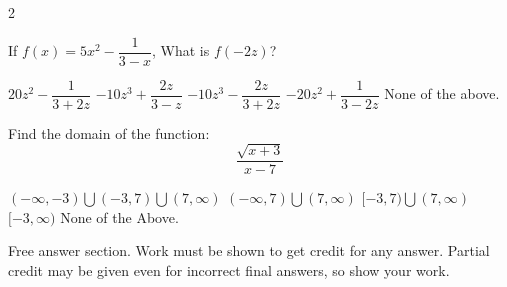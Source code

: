 \documentclass[addpoints,12pt]{exam}
\newcommand{\chooseone}{{\Large$\Circle$\ \ }}
\begin{document}
\begin{questions}
\begin{multicols}{2}
\begin{choices}

\end{choices}
\end{multicols}

\question[3] If $f(x)=5x^2-\dfrac{1}{3-x}$, What is $f(-2z)$?
\begin{choices}
    \choice \chooseone $20z^2-\dfrac{1}{3+2z}$
    \choice \chooseone $-10z^3+\dfrac{2z}{3-z} $
    \choice \chooseone $-10z^3-\dfrac{2z}{3+2z}$
    \choice \chooseone $-20z^2+\dfrac{1}{3-2z}$
    \choice \chooseone None of the above.
\end{choices}

    \question[3] Find the domain of the function:
\[ \dfrac{\sqrt{x+3}}{x-7}\]
\begin{choices}
    \choice \chooseone $(-\infty, -3)\bigcup(-3,7)\bigcup(7,\infty)$
    \choice \chooseone $(-\infty, 7)\bigcup(7,\infty)$
    \choice \chooseone $[-3,7)\bigcup(7,\infty)$
    \choice \chooseone $[-3,\infty)$
    \choice \chooseone None of the Above.
\end{choices}

\newpage
\hspace{-.5in}Free answer section. Work must be shown to get credit for any answer. Partial credit may be given even for incorrect final answers, so show your work.


\end{questions}
\end{document}
